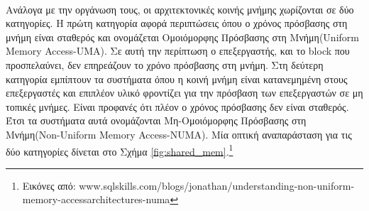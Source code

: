 \paragraph{}
Ανάλογα με την οργάνωση τους, οι αρχιτεκτονικές κοινής μνήμης χωρίζονται σε δύο κατηγορίες. Η πρώτη κατηγορία αφορά περιπτώσεις όπου ο χρόνος πρόσβασης στη μνήμη είναι σταθερός και ονομάζεται Ομοιόμορφης Πρόσβασης στη Μνήμη(Uniform Memory Access-UMA). Σε αυτή την περίπτωση ο επεξεργαστής, και το block που προσπελαύνει, δεν επηρεάζουν το χρόνο πρόσβασης στη μνήμη. Στη δεύτερη κατηγορία εμπίπτουν τα συστήματα όπου η κοινή μνήμη είναι κατανεμημένη στους επεξεργαστές και επιπλέον υλικό φροντίζει για την πρόσβαση των επεξεργαστών σε μη τοπικές μνήμες. Είναι προφανές ότι πλέον ο χρόνος πρόσβασης δεν είναι σταθερός. Έτσι τα συστήματα αυτά ονομάζονται Μη-Ομοιόμορφης Πρόσβασης στη Μνήμη(Non-Uniform Memory Access-NUMA). Μία οπτική αναπαράσταση για τις δύο κατηγορίες δίνεται στο Σχήμα \ref{fig:shared_mem}.\footnote{Εικόνες από: www.sqlskills.com/blogs/jonathan/understanding-non-uniform-memory-accessarchitectures-numa}

